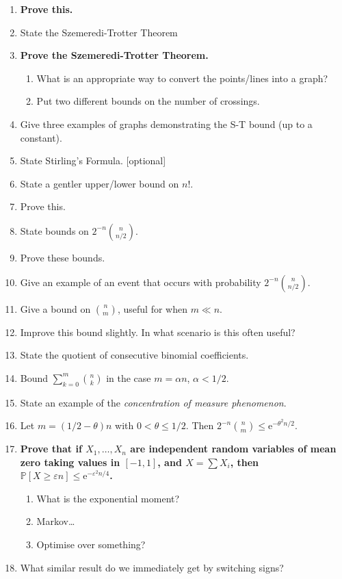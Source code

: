 \documentclass[10pt]{article}
\renewcommand{\rm}[1]{\mathrm{#1}}
\newcommand{\e}{\rm{e}}
\newcommand{\eps}{\varepsilon}
\renewcommand{\P}{\mathbb{P}}
\begin{document}
\begin{enumerate}
    \item \textbf{Prove this.}
    \item State the Szemeredi-Trotter Theorem
    \item \textbf{Prove the Szemeredi-Trotter Theorem.}
    \begin{enumerate}
        \item What is an appropriate way to convert the points/lines into a graph?
        \item Put two different bounds on the number of crossings.
    \end{enumerate}
    \item Give three examples of graphs demonstrating the S-T bound (up to a constant).
    \item State Stirling's Formula. [optional]
    \item State a gentler upper/lower bound on $n!$.
    \item Prove this.
    \item State bounds on $2^{-n}{n\choose n/2}$.
    \item Prove these bounds.
    \item Give an example of an event that occurs with probability $2^{-n}{n\choose n/2}$.
    \item Give a bound on ${n\choose m}$, useful for when $m \ll  n$.
    \item Improve this bound slightly. In what scenario is this often useful?
    \item State the quotient of consecutive binomial coefficients.
    \item Bound $\sum_{k=0}^{m}{n\choose k}$ in the case $m =\alpha n$, $\alpha < 1/2$.
    \item State an example of the \textit{concentration of measure phenomenon}.
    \item Let $m = (1/2 - \theta)n$ with $0 < \theta \le 1/2$. Then $2^{-n}{n\choose m}\le \e^{-\theta^2n/2}$.
    \item \textbf{Prove that if $X_1,\dots,X_n$ are independent random variables of mean zero taking values in $[-1,1]$, and $X = \sum X_i$, then $\P[X\ge \eps n] \le \e^{-\eps^2n/4}$.}
    \begin{enumerate}
        \item What is the exponential moment?
        \item Markov\dots
        \item Optimise over something?
    \end{enumerate}
    \item What similar result do we immediately get by switching signs?

\end{enumerate}
\end{document}
